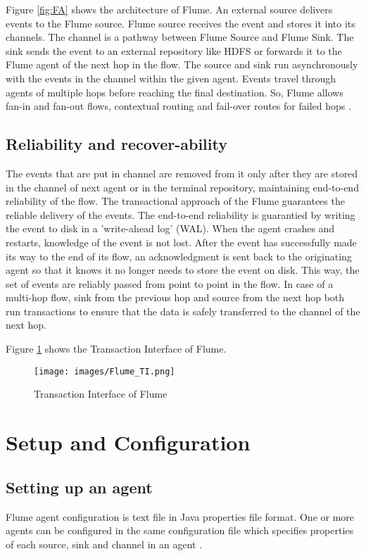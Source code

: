 \documentclass[9pt,twocolumn,twoside]{styles/osajnl}
\begin{document}
Figure \ref{fig:FA} shows the architecture of Flume. An external source delivers events to the Flume source. Flume source receives the event and stores it into its channels. The channel is a pathway between Flume Source and Flume Sink. The sink sends the event to an external repository like HDFS or forwards it to the Flume agent of the next hop in the flow. The source and sink run asynchronously with the events in the channel within the given agent. Events travel through agents of multiple hops before reaching the final destination.
So, Flume allows fan-in and fan-out flows, contextual routing and fail-over routes for failed hops  \cite{cloudera}.

\subsection{Reliability and recover-ability}

The events that are put in channel are removed from it only after they are stored in the channel of next agent or in the terminal repository, maintaining end-to-end reliability of the flow. The transactional approach of the Flume guarantees the reliable delivery of the events.
The end-to-end reliability is guarantied by writing the event to disk in a 'write-ahead log' (WAL). When the agent crashes and restarts, knowledge of the event is not lost. After the event has successfully made its way to the end of its flow, an acknowledgment is sent back to the originating agent so that it knows it no longer needs to store the event on disk. This way, the set of events are reliably passed from point to point in the flow. In case of a multi-hop flow, sink from the previous hop and source from the next hop both run transactions to ensure that the data is safely transferred to the channel of the next hop.

Figure \ref{fig:TI} shows the Transaction Interface of Flume.
\begin{figure}[htbp]
\centering
\texttt{[image: images/Flume\_TI.png]}
\caption{Transaction Interface of Flume \cite{dev-manual}}
\label{fig:TI}
\end{figure}

\section{Setup and Configuration}
\subsection{Setting up an agent}
Flume agent configuration is text file in Java properties file format. One or more agents can be configured in the same configuration file which specifies properties of each source, sink and channel in an agent \cite{user-manual}.
\end{document}
